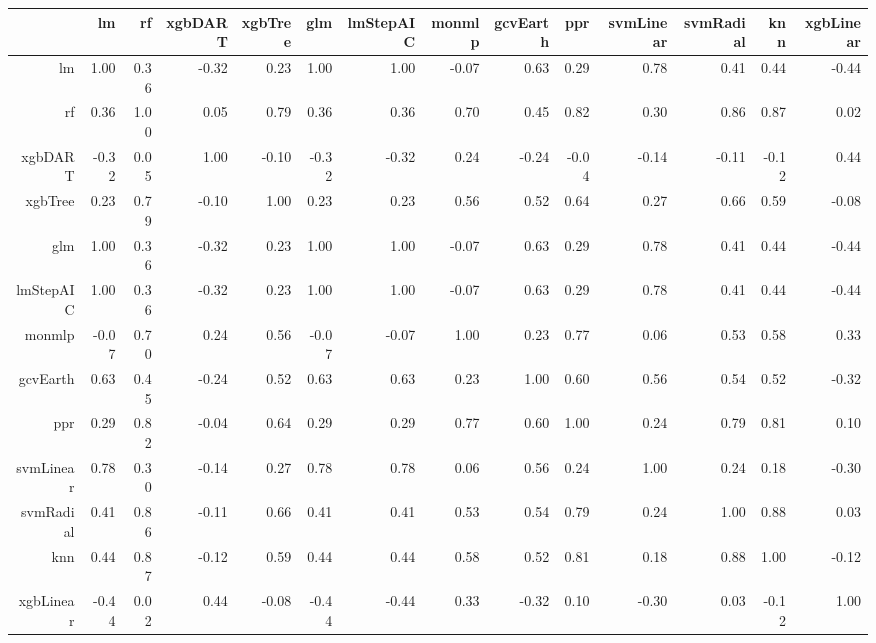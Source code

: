\begin{table}[ht]
\centering
\begin{tabular}{rrrrrrrrrrrrrr}
  \hline
 & lm & rf & xgbDART & xgbTree & glm & lmStepAIC & monmlp & gcvEarth & ppr & svmLinear & svmRadial & knn & xgbLinear \\ 
  \hline
lm & 1.00 & 0.36 & -0.32 & 0.23 & 1.00 & 1.00 & -0.07 & 0.63 & 0.29 & 0.78 & 0.41 & 0.44 & -0.44 \\ 
  rf & 0.36 & 1.00 & 0.05 & 0.79 & 0.36 & 0.36 & 0.70 & 0.45 & 0.82 & 0.30 & 0.86 & 0.87 & 0.02 \\ 
  xgbDART & -0.32 & 0.05 & 1.00 & -0.10 & -0.32 & -0.32 & 0.24 & -0.24 & -0.04 & -0.14 & -0.11 & -0.12 & 0.44 \\ 
  xgbTree & 0.23 & 0.79 & -0.10 & 1.00 & 0.23 & 0.23 & 0.56 & 0.52 & 0.64 & 0.27 & 0.66 & 0.59 & -0.08 \\ 
  glm & 1.00 & 0.36 & -0.32 & 0.23 & 1.00 & 1.00 & -0.07 & 0.63 & 0.29 & 0.78 & 0.41 & 0.44 & -0.44 \\ 
  lmStepAIC & 1.00 & 0.36 & -0.32 & 0.23 & 1.00 & 1.00 & -0.07 & 0.63 & 0.29 & 0.78 & 0.41 & 0.44 & -0.44 \\ 
  monmlp & -0.07 & 0.70 & 0.24 & 0.56 & -0.07 & -0.07 & 1.00 & 0.23 & 0.77 & 0.06 & 0.53 & 0.58 & 0.33 \\ 
  gcvEarth & 0.63 & 0.45 & -0.24 & 0.52 & 0.63 & 0.63 & 0.23 & 1.00 & 0.60 & 0.56 & 0.54 & 0.52 & -0.32 \\ 
  ppr & 0.29 & 0.82 & -0.04 & 0.64 & 0.29 & 0.29 & 0.77 & 0.60 & 1.00 & 0.24 & 0.79 & 0.81 & 0.10 \\ 
  svmLinear & 0.78 & 0.30 & -0.14 & 0.27 & 0.78 & 0.78 & 0.06 & 0.56 & 0.24 & 1.00 & 0.24 & 0.18 & -0.30 \\ 
  svmRadial & 0.41 & 0.86 & -0.11 & 0.66 & 0.41 & 0.41 & 0.53 & 0.54 & 0.79 & 0.24 & 1.00 & 0.88 & 0.03 \\ 
  knn & 0.44 & 0.87 & -0.12 & 0.59 & 0.44 & 0.44 & 0.58 & 0.52 & 0.81 & 0.18 & 0.88 & 1.00 & -0.12 \\ 
  xgbLinear & -0.44 & 0.02 & 0.44 & -0.08 & -0.44 & -0.44 & 0.33 & -0.32 & 0.10 & -0.30 & 0.03 & -0.12 & 1.00 \\ 
   \hline
\end{tabular}
\end{table}
